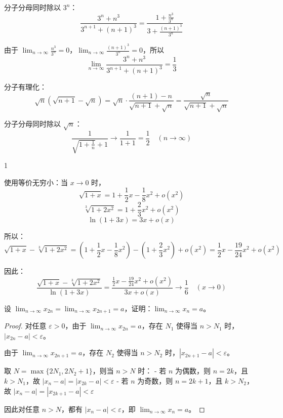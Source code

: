 \documentclass[lang=cn,12pt]{elegantbook}
\begin{document}
\begin{solution}[(1)]
分子分母同时除以 $3^n$：
\[
\frac{3^n+n^3}{3^{n+1}+(n+1)^3} = \frac{1 + \frac{n^3}{3^n}}{3 + \frac{(n+1)^3}{3^n}}
\]

由于 $\lim_{n \to \infty} \frac{n^3}{3^n} = 0$，$\lim_{n \to \infty} \frac{(n+1)^3}{3^n} = 0$，所以
\[
\lim_{n \to \infty} \frac{3^n+n^3}{3^{n+1}+(n+1)^3} = \frac{1}{3}
\]
\end{solution}

\begin{solution}[(2)]
分子有理化：
\[
\sqrt{n} (\sqrt{n+1} - \sqrt{n}) = \sqrt{n} \cdot \frac{(n+1)-n}{\sqrt{n+1} + \sqrt{n}} = \frac{\sqrt{n}}{\sqrt{n+1} + \sqrt{n}}
\]

分子分母同时除以 $\sqrt{n}$：
\[
\frac{1}{\sqrt{1+\frac{1}{n}} + 1} \to \frac{1}{1+1} = \frac{1}{2} \quad (n \to \infty)
\]
\end{solution}

\begin{solution}[(3)]
1
\end{solution}

\begin{solution}[(4)]
使用等价无穷小：当 $x \to 0$ 时，
\[
\sqrt{1+x} = 1 + \frac{1}{2}x - \frac{1}{8}x^2 + o(x^2)
\]
\[
\sqrt[3]{1+2x^2} = 1 + \frac{2}{3}x^2 + o(x^2)
\]
\[
\ln(1+3x) = 3x + o(x)
\]

所以：
\[
\sqrt{1+x} - \sqrt[3]{1+2x^2} = \left(1 + \frac{1}{2}x - \frac{1}{8}x^2\right) - \left(1 + \frac{2}{3}x^2\right) + o(x^2) = \frac{1}{2}x - \frac{19}{24}x^2 + o(x^2)
\]

因此：
\[
\frac{\sqrt{1+x} - \sqrt[3]{1+2x^2}}{\ln(1+3x)} = \frac{\frac{1}{2}x - \frac{19}{24}x^2 + o(x^2)}{3x + o(x)} \to \frac{1}{6} \quad (x \to 0)
\]
\end{solution}

\begin{example}
设 $\lim_{n \to \infty} x_{2n} = \lim_{n \to \infty} x_{2n+1} = a$，证明：$\lim_{n \to \infty} x_n = a$。
\end{example}

\begin{proof}
对任意 $\varepsilon > 0$，由于 $\lim_{n \to \infty} x_{2n} = a$，存在 $N_1$ 使得当 $n > N_1$ 时，$|x_{2n} - a| < \varepsilon$。

由于 $\lim_{n \to \infty} x_{2n+1} = a$，存在 $N_2$ 使得当 $n > N_2$ 时，$|x_{2n+1} - a| < \varepsilon$。

取 $N = \max\{2N_1, 2N_2 + 1\}$，则当 $n > N$ 时：
- 若 $n$ 为偶数，则 $n = 2k$，且 $k > N_1$，故 $|x_n - a| = |x_{2k} - a| < \varepsilon$
- 若 $n$ 为奇数，则 $n = 2k+1$，且 $k > N_2$，故 $|x_n - a| = |x_{2k+1} - a| < \varepsilon$

因此对任意 $n > N$，都有 $|x_n - a| < \varepsilon$，即 $\lim_{n \to \infty} x_n = a$。
\end{proof}
\end{document}
